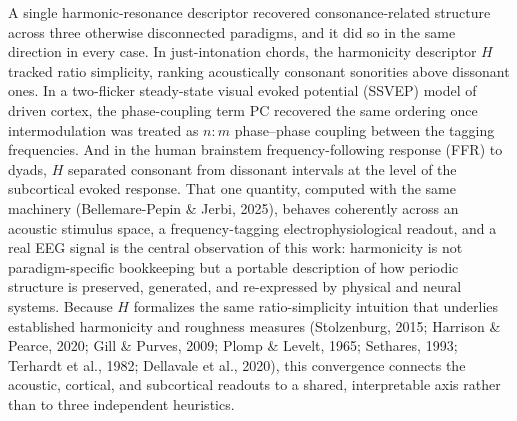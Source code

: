 \documentclass[11pt]{article}
\begin{document}
A single harmonic-resonance descriptor recovered consonance-related structure across three otherwise disconnected paradigms, and it did so in the same direction in every case. In just-intonation chords, the harmonicity descriptor $H$ tracked ratio simplicity, ranking acoustically consonant sonorities above dissonant ones. In a two-flicker steady-state visual evoked potential (SSVEP) model of driven cortex, the phase-coupling term $\mathrm{PC}$ recovered the same ordering once intermodulation was treated as $n{:}m$ phase--phase coupling between the tagging frequencies. And in the human brainstem frequency-following response (FFR) to dyads, $H$ separated consonant from dissonant intervals at the level of the subcortical evoked response. That one quantity, computed with the same machinery (Bellemare-Pepin \& Jerbi, 2025), behaves coherently across an acoustic stimulus space, a frequency-tagging electrophysiological readout, and a real EEG signal is the central observation of this work: harmonicity is not paradigm-specific bookkeeping but a portable description of how periodic structure is preserved, generated, and re-expressed by physical and neural systems. Because $H$ formalizes the same ratio-simplicity intuition that underlies established harmonicity and roughness measures (Stolzenburg, 2015; Harrison \& Pearce, 2020; Gill \& Purves, 2009; Plomp \& Levelt, 1965; Sethares, 1993; Terhardt et al., 1982; Dellavale et al., 2020), this convergence connects the acoustic, cortical, and subcortical readouts to a shared, interpretable axis rather than to three independent heuristics.
\end{document}
